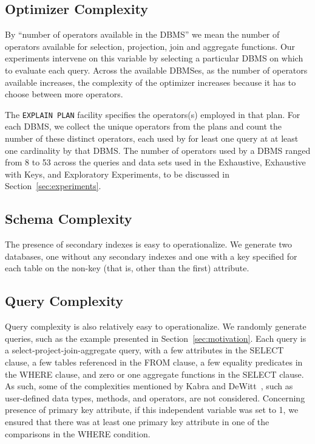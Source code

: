 \documentclass[prodmode,acmtods]{acmsmall}
\begin{document}
\subsection{Optimizer Complexity}
By ``number of operators available in the \hbox{DBMS}'' we mean the \hbox{number} of operators
available for selection, projection, join and aggregate functions. Our
experiments intervene on this variable by selecting a particular \hbox{DBMS} on
which to evaluate each query. Across the available \hbox{DBMSes}, as the number of
operators available increases, the complexity of the optimizer increases
because it has to choose between more operators.

The {\tt EXPLAIN PLAN} facility specifies the operators(s) \hbox{employed} in that
plan. For each \hbox{DBMS}, we collect the unique operators from the plans
and count the number of these distinct operators, each used by for least one
query at at least one cardinality by that \hbox{DBMS}. The number of operators used
by a \hbox{DBMS} ranged from 8 to 53 across the queries and data sets
used in the Exhaustive, Exhaustive with Keys, and Exploratory Experiments,
to be discussed in Section~\ref{sec:experiments}.

\subsection{Schema Complexity}
The presence of secondary indexes is easy to operationalize. We generate two
databases, one without any secondary indexes and one with a key specified
for each table on the non-key (that is, other than the first) attribute.

\subsection{Query Complexity}\label{sec:querycomplexity}
Query complexity is also relatively easy to operationalize. We randomly generate queries,
such as the example presented in Section~\ref{sec:motivation}. Each query
is a select-project-join-aggregate query, with a few attributes in the
SELECT clause, a few tables referenced in the FROM clause, a few
equality predicates in the WHERE clause, and zero or one aggregate
functions in the SELECT clause. As such, some of the complexities
mentioned by Kabra and \hbox{DeWitt~\cite{kabra98},} such as
user-defined data types, methods, and operators, are not
considered. Concerning presence of primary key attribute, if this independent
variable was set to 1, we ensured that there was at least one primary key
attribute in one of the comparisons in the WHERE condition.
\end{document}
